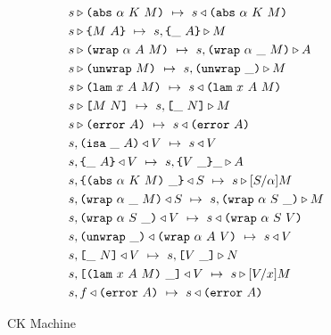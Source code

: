 \documentclass[../main.tex]{subfiles}
\begin{document}
\begin{figure*}[t]
    
    \begin{align*}
        &s \triangleright \texttt{(} \texttt{abs} ~ \alpha ~ K ~ M \texttt{)} ~\mapsto~ s \triangleleft \texttt{(} \texttt{abs} ~ \alpha ~ K ~ M \texttt{)}\\
        &s \triangleright \texttt{\{}M ~ A\texttt{\}} ~\mapsto~ s, \texttt{\{}\_ ~ A\texttt{\}} \triangleright M\\
        &s \triangleright \texttt{(} \texttt{wrap} ~ \alpha ~ A ~ M \texttt{)} ~\mapsto~ s, \texttt{(} \texttt{wrap} ~ \alpha ~ \_ ~ M \texttt{)} \triangleright A\\
        &s \triangleright \texttt{(} \texttt{unwrap} ~ M \texttt{)} ~\mapsto~ s, \texttt{(} \texttt{unwrap} ~ \_ \texttt{)}{} \triangleright M\\
        &s \triangleright \texttt{(} \texttt{lam} ~ x ~ A ~ M \texttt{)} ~\mapsto~ s \triangleleft \texttt{(} \texttt{lam} ~ x ~ A ~ M \texttt{)}\\
        &s \triangleright \texttt{[} M ~ N \texttt{]} ~\mapsto~ s, \texttt{[} \_ ~ N \texttt{]} \triangleright M\\
        &s \triangleright \texttt{(} \texttt{error} ~ A \texttt{)} ~\mapsto~ s \triangleleft \texttt{(} \texttt{error} ~ A \texttt{)}\\
        &s, \texttt{(} \texttt{isa} ~ \_ ~ A \texttt{)} \triangleleft V ~\mapsto~ s \triangleleft V\\
        &s, \texttt{\{}\_ ~ A\texttt{\}} \triangleleft V ~\mapsto~ s, \texttt{\{}V ~ \_\texttt{\}}{\_} \triangleright A\\
        &s, \texttt{\{}\texttt{(} \texttt{abs} ~ \alpha ~ K ~ M \texttt{)} ~ \_\texttt{\}} \triangleleft S ~\mapsto~ s \triangleright [S/\alpha]M\\
        &s, \texttt{(} \texttt{wrap} ~ \alpha ~ \_ ~ M \texttt{)} \triangleleft S ~\mapsto~ s, \texttt{(} \texttt{wrap} ~ \alpha ~ S ~ \_ \texttt{)} \triangleright M\\
        &s, \texttt{(} \texttt{wrap} ~ \alpha ~ S ~ \_ \texttt{)} \triangleleft V ~\mapsto~ s \triangleleft \texttt{(} \texttt{wrap} ~ \alpha ~ S ~ V \texttt{)}\\
        &s, \texttt{(} \texttt{unwrap} ~ \_ \texttt{)}{} \triangleleft \texttt{(} \texttt{wrap} ~ \alpha ~ A ~ V \texttt{)} ~\mapsto~ s \triangleleft V\\
        &s, \texttt{[} \_ ~ N \texttt{]} \triangleleft V ~\mapsto~ s, \texttt{[} V ~ \_ \texttt{]} \triangleright N\\
        &s, \texttt{[} \texttt{(} \texttt{lam} ~ x ~ A ~ M \texttt{)} ~ \_ \texttt{]} \triangleleft V ~\mapsto~ s \triangleright [V/x]M\\
        &s, f \triangleleft \texttt{(} \texttt{error} ~ A \texttt{)} ~\mapsto~ s \triangleleft \texttt{(} \texttt{error} ~ A \texttt{)}\\
    \end{align*}
    
    \caption{CK Machine}
    \label{fig:Plutus_core_ck_machine}
\end{figure*}
\end{document}
